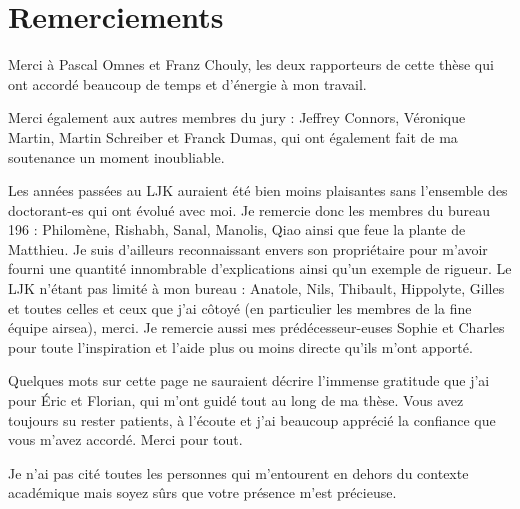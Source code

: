\section*{Remerciements}
Merci à Pascal Omnes et Franz Chouly, les deux rapporteurs de cette
thèse qui ont accordé beaucoup de temps et d'énergie à mon
travail.
\vspace*{1.5em}
\par
Merci également aux autres membres du jury : Jeffrey Connors,
Véronique Martin, Martin Schreiber et Franck Dumas, qui ont
également fait de ma soutenance un moment inoubliable.
\vspace*{1.5em}
\par
Les années passées au LJK auraient été bien moins plaisantes sans
l'ensemble des doctorant-es qui ont évolué avec moi.
Je remercie donc les membres
du bureau 196 : Philomène, Rishabh, Sanal, Manolis, Qiao
ainsi que feue la plante de Matthieu.
Je suis d'ailleurs reconnaissant
envers son propriétaire pour m'avoir fourni une quantité innombrable
d'explications ainsi qu'un exemple de rigueur.
Le LJK n'étant pas limité à mon bureau :
Anatole, Nils, Thibault, Hippolyte, Gilles
et toutes celles et ceux que j'ai côtoyé
(en particulier les membres de la fine équipe airsea), merci.
Je remercie aussi mes prédécesseur-euses Sophie et Charles pour
toute l'inspiration et l'aide plus ou moins directe qu'ils
m'ont apporté.
\vspace*{1.5em}
\par
Quelques mots sur cette page ne sauraient décrire l'immense gratitude
que j'ai pour Éric et Florian, qui m'ont guidé tout au long de
ma thèse. Vous avez toujours su rester patients, à l'écoute et 
j'ai beaucoup apprécié la confiance que vous m'avez accordé.
Merci pour tout.
\vspace*{1.5em}
\par
Je n'ai pas cité toutes les personnes qui m'entourent 
en dehors du contexte académique mais soyez sûrs que votre
présence m'est précieuse.

